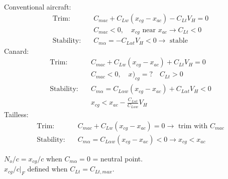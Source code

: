 \documentclass[draft=false, titlepage]{article}
\begin{document}
Conventional aircraft:
\begin{align*}
\text{Trim:} \quad& C_{mac} + C_{Lw}(x_{cg}-x_{ac}) - C_{Lt}V_H = 0\\
&C_{mac} < 0,\quad x_{cg} \text{ near } x_{ac}\rightarrow C_{Lt} < 0\\
\text{Stability:} \quad& C_{m\alpha} = -C_{L\alpha t} V_H < 0 \rightarrow \text{ stable}
\end{align*}
Canard:
\begin{align*}
\text{Trim:} \quad& C_{mac} + C_{Lw}(x_{cg}-x_{ac}) + C_{Lt}V_H=0\\
&C_{mac} < 0,\quad x)_{cg} = ? \quad C_{Lt} > 0\\
\text{Stability:} \quad& C_{m\alpha} = C_{L\alpha w} (x_{cg}-x_{ac}) + C_{L\alpha t} V_H < 0\\
& x_{cg} < x_{ac} - \frac{C_{L\alpha t}}{C_{L\alpha w}} V_H
\end{align*}
Tailless:
\begin{align*}
\text{Trim:}\quad& C_{mac} + C_{Lw}(x_{cg}-x_{ac}) = 0\rightarrow \text{ trim with } C_{mac}\\
\text{Stability:} \quad& C_{m\alpha} = C_{L\alpha w}(x_{cg}-x_{ac}) < 0 \rightarrow x_{cg} < x_{ac}
\end{align*}

\noindent $N_o/c = x_{cg}/c$ when $C_{m\alpha} = 0$ = neutral point.\\
$x_{cg}/c\big|_F$ defined when $C_{Lt} = C_{Lt,max}$.\\
\end{document}
